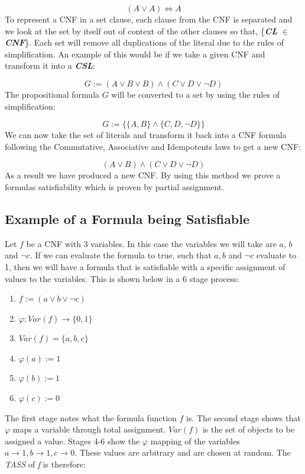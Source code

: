 \documentclass[11pt,a4paper, notitlepage]{report}
\begin{document}
\begin{displaymath}
(A \lor A) \Leftrightarrow A
\end{displaymath}
To represent a CNF in a set clause, each clause from the CNF is separated and we look at the set by itself out of context of the other clauses so that, \{\textbf{\textit{CL}} $\in$ \textbf{\textit{CNF}}\}. Each set will remove all duplications of the literal due to the rules of simplification. An example of this would be if we take a given CNF and transform it into a \textbf{\textit{CSL}}:

\begin{displaymath}
G:= (A \lor B \lor B) \land (C \lor D \lor \neg D)
\end{displaymath}
The propositional formula $G$ will be converted to a set by using the rules of simplification:

\begin{displaymath}
 G := \{\{{{A,B}\} \land \{{C,D,\neg D}}\}\}
\end{displaymath}
We can now take the set of literals and transform it back into a CNF formula following the Commutative, Associative and Idempotents laws to get a new CNF:

\begin{displaymath}
(A \lor B) \land (C \lor D \lor \neg D)
\end{displaymath}
As a result we have produced a new CNF. By using this method we prove a formulas satisfiability which is proven by partial assignment.

\subsection{Example of a Formula being Satisfiable}
\label{subsec:ExampleFormSAT}

Let $f$ be a CNF with 3 variables. In this case the variables we will take are $a$, $b$ and $\neg c$. If we can evaluate the formula to true, such that $a, b$ and $\neg c$ evaluate to 1, then we will have a formula that is satisfiable with a specific assignment of values to the variables. This is shown below in a 6 stage process:

\begin{enumerate}
\item $f:= (a \lor b \lor \neg c)$
\item $\varphi: Var (f) \rightarrow \{0,1\}$
\item $Var (f) = \{a,b,c\}$
\item $\varphi(a):= 1$
\item $\varphi(b):= 1$
\item $\varphi(c):= 0$
\end{enumerate}
The first stage notes what the formula function $f$ is. The second stage shows that $\varphi$ maps a variable through total assignment. $Var(f)$ is the set of objects to be assigned a value. Stages 4-6 show the $\varphi$ mapping of the variables $a \rightarrow 1, b \rightarrow 1, c \rightarrow 0$. These values are arbitrary and are chosen at random.
The \textit{TASS} of \textit{f} is therefore:
\end{document}
